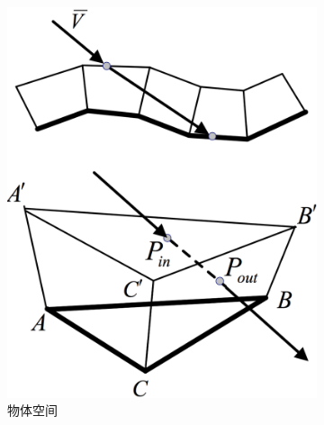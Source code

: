 \begin{figure}
\begin{center}
	\begin{subfigure}[b]{0.35\textwidth}
		\includegraphics[width=\textwidth]{figures/df/GDM-object-space-ray}
		\caption{物体空间}
	\end{subfigure}
	\begin{subfigure}[b]{0.35\textwidth}

\end{subfigure}
\end{center}
\end{figure}
